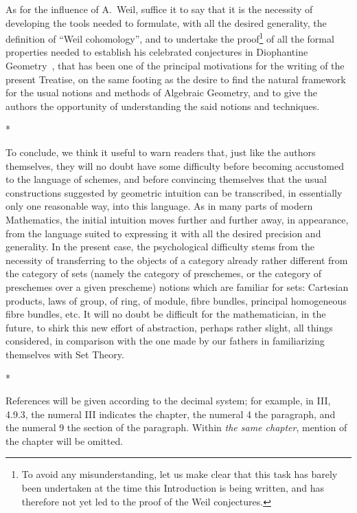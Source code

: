 As for the influence of A.~Weil, suffice it to say that it is the necessity of developing the tools needed to formulate, with all the desired generality, the definition of ``Weil cohomology'', and to undertake the proof\footnote{To avoid any misunderstanding, let us make clear that this task has barely been undertaken at the time this Introduction is being written, and has therefore not yet led to the proof of the Weil conjectures.} of all the formal properties needed to establish his celebrated conjectures in Diophantine Geometry~\cite{I-19}, that has been one of the principal motivations for the writing of the present Treatise, on the same footing as the desire to find the natural framework for the usual notions and methods of Algebraic Geometry, and to give the authors the opportunity of understanding the said notions and techniques.

\bigskip
\begin{center}*\quad*\quad*\end{center}
\bigskip

To conclude, we think it useful to warn readers that, just like the authors themselves, they will no doubt have some difficulty before becoming accustomed to the language of schemes, and before convincing themselves that the usual constructions suggested by geometric intuition can be transcribed, in essentially only one reasonable way, into this language.
As in many parts of modern Mathematics, the initial intuition moves further and further away, in appearance, from the language suited to expressing it with all the desired precision and generality.
In the present case, the psychological difficulty stems from the necessity of transferring to the objects of a category already rather different from the category of sets (namely the category of preschemes, or the category of preschemes over a given prescheme) notions which are familiar for sets: Cartesian products, laws of group, of ring, of module, fibre bundles, principal homogeneous fibre bundles, etc.
It will no doubt be difficult for the mathematician, in the future, to shirk this new effort of abstraction, perhaps rather slight, all things considered, in comparison with the one made by our fathers in familiarizing themselves with Set Theory.

\bigskip
\begin{center}*\quad*\quad*\end{center}
\bigskip

References will be given according to the decimal system; for example, in III, 4.9.3, the numeral III indicates the chapter, the numeral 4 the paragraph, and the numeral 9 the section of the paragraph.
Within \emph{the same chapter}, mention of the chapter will be omitted.
